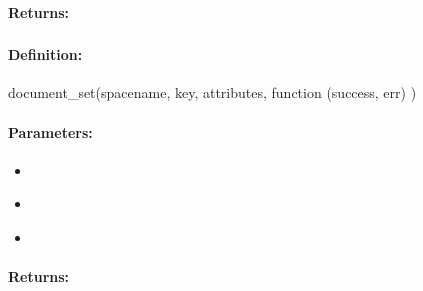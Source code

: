 \paragraph{Returns:}


\pagebreak
\subsubsection{}
\label{api:nodejs:document_set}


\paragraph{Definition:}
\begin{javascriptcode}
document_set(spacename, key, attributes, function (success, err) {})
\end{javascriptcode}
\paragraph{Parameters:}
\begin{itemize}[noitemsep]
\item {}\\

\item {}\\

\item {}\\

\end{itemize}

\paragraph{Returns:}


\pagebreak
\subsubsection{}
\label{api:nodejs:map_atomic_add}


